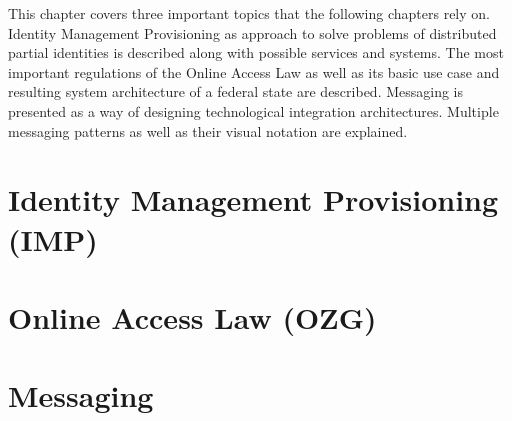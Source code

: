 This chapter covers three important topics that the following chapters rely on. Identity Management Provisioning as approach to solve problems of distributed partial identities is described along with possible services and systems. The most important regulations of the Online Access Law as well as its basic use case and resulting system architecture of a federal state are described. Messaging is presented as a way of designing technological integration architectures. Multiple messaging patterns as well as their visual notation are explained.

\section{Identity Management Provisioning (IMP)} \label{imp}


\section{Online Access Law (OZG)} \label{ozg}


\section{Messaging} \label{messaging}
